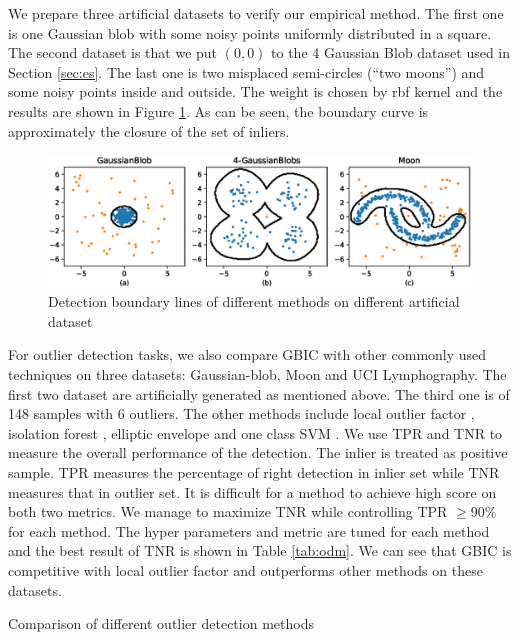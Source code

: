 We prepare three artificial datasets to verify our empirical method. The first one is one Gaussian blob with some noisy points uniformly distributed in a square. The second dataset is that we put $(0,0)$ to the 4 Gaussian Blob dataset used in Section \ref{sec:es}. The last one is two misplaced semi-circles (``two moons'') and some noisy points inside and outside. The weight is chosen by rbf kernel and the results are shown in Figure \ref{fig:boundary}. As can be seen, the boundary curve is approximately the closure of the set of inliers.
\begin{figure}[!ht]
	\centering
	\includegraphics[width=\textwidth]{pic/outlier_boundary_illustration.eps}
	\caption{Detection boundary lines of different methods on different artificial dataset}	\label{fig:boundary}
\end{figure}

For outlier detection tasks, we also compare GBIC with other commonly used techniques on three datasets: Gaussian-blob, Moon and UCI Lymphography. The first two dataset are artificially generated as mentioned above. The third one is of 148 samples with 6 outliers. The other methods include local outlier factor \citep{Breunig}, isolation forest \citep{if}, elliptic envelope \citep{rousseeuw1999fast} and one class SVM \citep{svm}. We use TPR and TNR to measure the overall performance of the detection. The inlier is treated as positive sample. TPR measures the percentage of right detection in inlier set while TNR measures that in outlier set. It is difficult for a method to achieve high score on both two metrics. We manage to maximize TNR while controlling TPR $\geq 90\%$ for each method. The hyper parameters and metric are tuned for each method and the best result of TNR is shown in Table \ref{tab:odm}. We can see that GBIC is competitive with local outlier factor and outperforms other methods on these datasets.

\begin{table}
\centering

\caption{Comparison of different outlier detection methods}\label{tab:odm}
\end{table}

